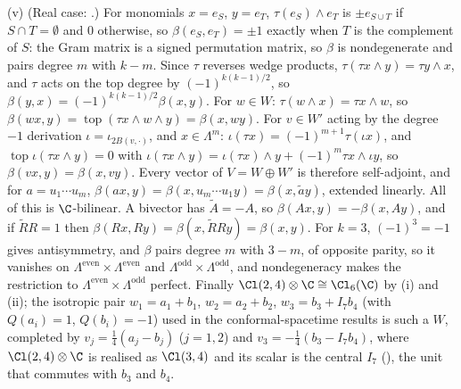 (v) (Real case: .) For monomials $x = e_S$, $y = e_T$, $\tau(e_S) \wedge e_T$ is $\pm e_{S \cup T}$ if $S \cap T = \emptyset$ and $0$ otherwise, so $\beta(e_S, e_T) = \pm 1$ exactly when $T$ is the complement of $S$: the Gram matrix is a signed permutation matrix, so $\beta$ is nondegenerate and pairs degree $m$ with $k - m$. Since $\tau$ reverses wedge products, $\tau(\tau x \wedge y) = \tau y \wedge x$, and $\tau$ acts on the top degree by $(-1)^{k(k-1)/2}$, so $\beta(y, x) = (-1)^{k(k-1)/2}\beta(x, y)$. For $w \in W$: $\tau(w \wedge x) = \tau x \wedge w$, so $\beta(wx, y) = \operatorname{top}(\tau x \wedge w \wedge y) = \beta(x, wy)$. For $v \in W'$ acting by the degree $-1$ derivation $\iota = \iota_{2B(v, \cdot)}$, and $x \in \Lambda^{m}$: $\iota(\tau x) = (-1)^{m+1}\tau(\iota x)$, and $\operatorname{top}\iota(\tau x \wedge y) = 0$ with $\iota(\tau x \wedge y) = \iota(\tau x) \wedge y + (-1)^{m}\tau x \wedge \iota y$, so $\beta(vx, y) = \beta(x, vy)$. Every vector of $V = W \oplus W'$ is therefore self-adjoint, and for $a = u_1 \cdots u_m$, $\beta(ax, y) = \beta(x, u_m \cdots u_1 y) = \beta(x, \tilde a y)$, extended linearly. All of this is $\C$-bilinear. A bivector has $\tilde A = -A$, so $\beta(Ax, y) = -\beta(x, Ay)$, and if $\tilde R R = 1$ then $\beta(Rx, Ry) = \beta(x, \tilde R R y) = \beta(x, y)$. For $k = 3$, $(-1)^{3} = -1$ gives antisymmetry, and $\beta$ pairs degree $m$ with $3 - m$, of opposite parity, so it vanishes on $\Lambda^{\mathrm{even}} \times \Lambda^{\mathrm{even}}$ and $\Lambda^{\mathrm{odd}} \times \Lambda^{\mathrm{odd}}$, and nondegeneracy makes the restriction to $\Lambda^{\mathrm{even}} \times \Lambda^{\mathrm{odd}}$ perfect. Finally $\Cl(2,4) \otimes \C \cong \Cl_6(\C)$ by (i) and (ii); the isotropic pair $w_1 = a_1 + b_1$, $w_2 = a_2 + b_2$, $w_3 = b_3 + I_7 b_4$ (with $Q(a_i) = 1$, $Q(b_i) = -1$) used in the conformal-spacetime results is such a $W$, completed by $v_j = \tfrac14(a_j - b_j)$ ($j = 1, 2$) and $v_3 = -\tfrac14(b_3 - I_7 b_4)$, where $\Cl(2,4) \otimes \C$ is realised as $\Cl(3,4)$ and its scalar is the central $I_7$ (), the unit that commutes with $b_3$ and $b_4$.
